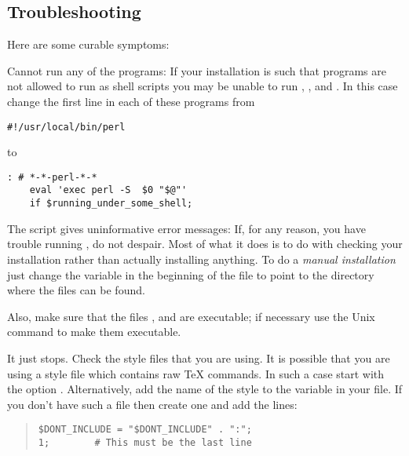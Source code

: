 \subsection{Troubleshooting}%
%
Here are some curable symptoms:

\begin{htmllist}
\item [Cannot run any of the \Perl{} programs: ]
If your \Perl{} installation is such that \Perl{} programs are not allowed 
to run as shell scripts you may be unable to run  
, ,  and  . 
In this case change the first line in each of these
programs from
\begin{small}
\begin{verbatim}
#!/usr/local/bin/perl
\end{verbatim}
\end{small}%
to
\begin{small}%
\begin{verbatim}
: # *-*-perl-*-*
    eval 'exec perl -S  $0 "$@"'
    if $running_under_some_shell; 
\end{verbatim}
\end{small}

\item [The \fn{install-test} script gives uninformative error messages: ]
If, for any reason, you have trouble running ,
do not despair. Most of what it does is to do with checking
your installation rather than actually installing anything.
To do a \textit{manual installation} just change the variable
 in the beginning of the file 
to point to the directory where the \latextohtml{} files can be found.

Also, make sure that the files
,  and  are executable;
if necessary use the Unix  command to make them 
executable.

\item [It just stops. ] Check the style
files that you are using. It is possible that you are using
a style file which contains raw \TeX{} commands. In such a case
start \latextohtml{} with the option 
. 
Alternatively, add the name of the style to the variable 
 in your
 file. If you don't have such a file then
create one and add the lines:
\begin{quote}
\begin{small}
\verb|$DONT_INCLUDE = "$DONT_INCLUDE" . ":|\verb|";|\\
\verb|1;        # This must be the last line|
\end{small}
\end{quote}


\end{htmllist}
